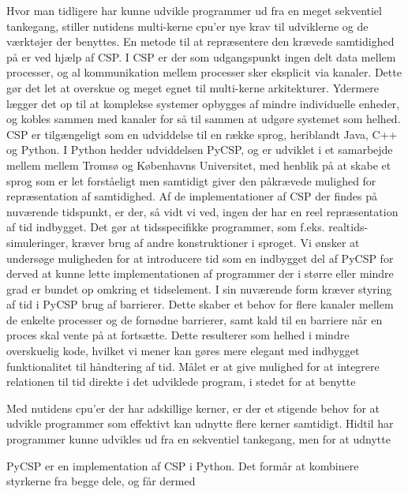 Hvor man tidligere har kunne udvikle programmer ud fra en meget sekventiel 
tankegang, stiller nutidens multi-kerne cpu'er nye krav til udviklerne og de 
værktøjer der benyttes.  
En metode til at repræsentere den krævede samtidighed på er ved hjælp af 
CSP\cite{hoare-csp}.  I CSP er der som udgangspunkt ingen delt data mellem 
processer, og al kommunikation mellem processer sker eksplicit via kanaler.  
Dette gør det let at overskue og meget egnet til multi-kerne arkitekturer.  
Ydermere lægger det op til at komplekse systemer opbygges af mindre 
individuelle enheder, og kobles sammen med kanaler for så til sammen at udgøre 
systemet som helhed. CSP er tilgængeligt som en udviddelse til en række sprog, 
heriblandt Java, C++ og Python. I Python hedder udviddelsen PyCSP, og er 
udviklet i et samarbejde mellem mellem Tromsø og Københavns Universitet, med 
henblik på at skabe et sprog som er let forståeligt men samtidigt giver den 
påkrævede mulighed for repræsentation af samtidighed.  Af de implementationer 
af CSP der findes på nuværende tidspunkt, er der, så vidt vi ved, ingen der har 
en reel repræsentation af tid indbygget. Det gør at tidsspecifikke programmer, 
som f.eks. realtids-simuleringer, kræver brug af andre konstruktioner i 
sproget.
Vi ønsker at undersøge muligheden for at introducere tid som en indbygget del 
af PyCSP for derved at kunne lette implementationen af programmer der i større 
eller mindre grad er bundet op omkring et tidselement. I sin nuværende form 
kræver styring af tid i PyCSP brug af barrierer. Dette skaber et behov for flere kanaler mellem de enkelte 
processer og de fornødne barrierer, samt kald til en barriere når en proces 
skal vente på at fortsætte.  Dette resulterer som helhed i mindre overskuelig 
kode, hvilket vi mener kan gøres mere elegant med indbygget funktionalitet til 
håndtering af tid. Målet er at give mulighed for at integrere relationen til 
tid direkte i det udviklede program, i stedet for at benytte 




Med nutidens cpu'er der har adskillige kerner, er der et stigende behov for at 
udvikle programmer som effektivt kan udnytte flere kerner samtidigt. Hidtil har 
programmer kunne udvikles ud fra en sekventiel tankegang, men for at udnytte 



PyCSP er en implementation af CSP i Python. Det formår at kombinere styrkerne 
fra begge dele, og får dermed 

